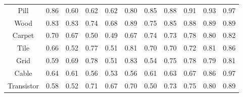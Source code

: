 \documentclass[runningheads]{llncs}
\begin{document}
\begin{table}[h]
\begin{center}
\begin{tabular}{ccccccccccc}
		Pill  &\cellcolor{blue!40}0.86    &\cellcolor{blue!10}0.60  &\cellcolor{blue!20}0.62 &\cellcolor{blue!20}0.62 &\cellcolor{blue!25}0.80 &\cellcolor{blue!30}0.85   &\cellcolor{blue!50}0.88 &\cellcolor{blue!60}0.91  &\cellcolor{blue!70}0.93 &\cellcolor{blue!80}\color{white}0.97\\
		          
		Wood    &\cellcolor{blue!40}0.83  &\cellcolor{blue!40}0.83  &\cellcolor{blue!20}0.74 &\cellcolor{blue!10}0.68 &\cellcolor{blue!80}\color{white}0.89 &\cellcolor{blue!30}0.75  &\cellcolor{blue!60}0.85  &\cellcolor{blue!70}0.88  &\cellcolor{blue!80}\color{white}0.89&\cellcolor{blue!80}\color{white}0.89\\
		          
		Carpet &\cellcolor{blue!30}0.70    &\cellcolor{blue!20}0.67  &\cellcolor{blue!15}0.50 &\cellcolor{blue!10}0.49 &\cellcolor{blue!20}0.67 &\cellcolor{blue!50}0.74  &\cellcolor{blue!40}0.73  &\cellcolor{blue!60}0.78  &\cellcolor{blue!70}0.80 &\cellcolor{blue!80}\color{white}0.82\\
		          
		Tile   &\cellcolor{blue!20}0.66   &\cellcolor{blue!15}0.52  &\cellcolor{blue!60}0.77 &\cellcolor{blue!10}0.51 &\cellcolor{blue!70}0.81 &\cellcolor{blue!30}0.70  &\cellcolor{blue!30}0.70  &\cellcolor{blue!50}0.72  &\cellcolor{blue!70}0.81 &\cellcolor{blue!80}\color{white}0.86\\
		          
		Grid   &\cellcolor{blue!20}0.59   &\cellcolor{blue!30}0.69  &\cellcolor{blue!50}0.78 &\cellcolor{blue!10}0.51 &\cellcolor{blue!80}\color{white}0.83 &\cellcolor{blue!15}0.54   &\cellcolor{blue!40}0.75  &\cellcolor{blue!50}0.78  &\cellcolor{blue!60}0.79&\cellcolor{blue!70}0.81\\
		          
		Cable &\cellcolor{blue!50}0.64    &\cellcolor{blue!30}0.61  &\cellcolor{blue!20}0.56 &\cellcolor{blue!10}0.53 &\cellcolor{blue!20}0.56 &\cellcolor{blue!30}0.61    &\cellcolor{blue!40}0.63  &\cellcolor{blue!60}0.67 &\cellcolor{blue!70}0.86 &\cellcolor{blue!80}\color{white}0.97\\
		          
		Transistor &\cellcolor{blue!20}0.58 &\cellcolor{blue!15}0.52  &\cellcolor{blue!40}0.71 &\cellcolor{blue!25}0.67 &\cellcolor{blue!30}0.70 &\cellcolor{blue!10}0.50  &\cellcolor{blue!50}0.73  &\cellcolor{blue!60}0.75  &\cellcolor{blue!70}0.80&\cellcolor{blue!80}\color{white}0.89\\
		          

\end{tabular}
\end{center}
\end{table}
\end{document}
